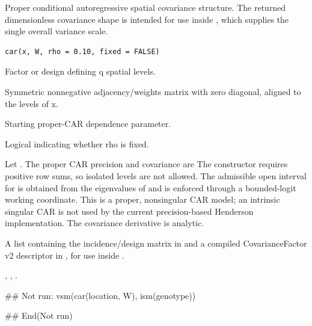 \documentclass[a4paper]{book}
\begin{document}
%
\begin{Description}\relax
Proper conditional autoregressive spatial covariance structure. The returned dimensionless covariance shape is intended for use inside , which supplies the single overall variance scale.
\end{Description}
%
\begin{Usage}
\begin{verbatim}
car(x, W, rho = 0.10, fixed = FALSE)
\end{verbatim}
\end{Usage}
%
\begin{Arguments}
\begin{ldescription}
\item[\code{x}] Factor or design defining q spatial levels.
\item[\code{W}] Symmetric nonnegative adjacency/weights matrix with zero diagonal, aligned to the levels of x.
\item[\code{rho}] Starting proper-CAR dependence parameter.
\item[\code{fixed}] Logical indicating whether rho is fixed.
\end{ldescription}
\end{Arguments}
%
\begin{Details}\relax
Let .  The proper CAR precision and covariance are  The constructor requires positive row sums, so isolated levels are not allowed.  The admissible open interval for  is obtained from the eigenvalues of  and is enforced through a bounded-logit working coordinate.  This is a proper, nonsingular CAR model; an intrinsic singular CAR is not used by the current precision-based Henderson implementation.  The covariance derivative is analytic.
\end{Details}
%
\begin{Value}
A list containing the incidence/design matrix in  and a compiled CovarianceFactor v2 descriptor in , for use inside .
\end{Value}
%
\begin{SeeAlso}\relax
{}, , .
\end{SeeAlso}
%
\begin{Examples}
\begin{ExampleCode}
## Not run: 
vsm(car(location, W), ism(genotype))

## End(Not run)
\end{ExampleCode}
\end{Examples}
\end{document}
